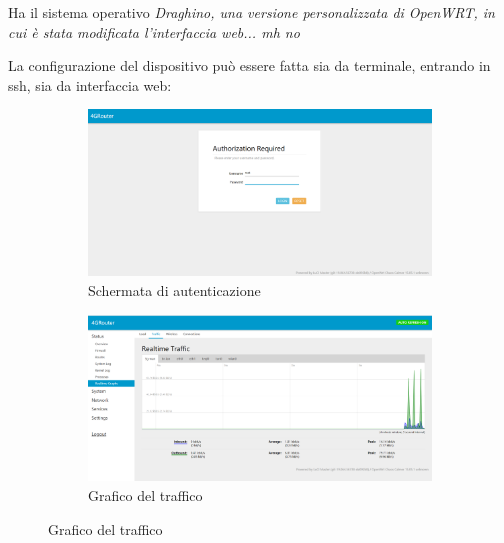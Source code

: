 Ha il sistema operativo \it{Draghino}, una versione personalizzata di OpenWRT, in cui è stata modificata l'interfaccia web... mh no

La configurazione del dispositivo può essere fatta sia da terminale, entrando in ssh, sia da interfaccia web:

\begin{figure}[H]

	\newlength{\tempheight}
	\setlength{\tempheight}{23ex}

	\centering%
	\begin{subfigure}[t]{0.5\textwidth}
		\centering%
		\includegraphics[totalheight=\tempheight]{immagini/interfacciar4g_init}
		\caption{Schermata di autenticazione}
	\end{subfigure}%
	\hfill
	\begin{subfigure}[t]{0.5\textwidth}
		\centering%
		\includegraphics[totalheight=\tempheight]{immagini/interfacciar4g_traffic}
		\caption{Grafico del traffico}
	\end{subfigure}

	\medskip


\end{figure}
